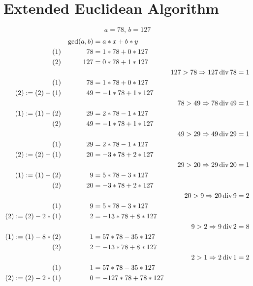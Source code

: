 \documentclass[11pt]{article} %
\begin{document}
\section{Extended Euclidean Algorithm}
\begin{equation}
	a=78,\, b=127
\end{equation}
\allowdisplaybreaks
\begin{align*}
	               && \text{gcd}(a,b) & =a*x+b*y\\
	(1)            && \qquad78        & =1*78+0*127     & \\
	(2)            && 127             & =0*78+1*127     & \\
	               &&                 &                 & 127>78\Rightarrow127\text{\,div\,}78=1\\
	(1)            && 78              & =1*78+0*127     & \\
	(2):=(2)-(1)   && 49              & =-1*78+1*127    & \\
	               &&                 &                 & 78>49\Rightarrow78\text{\,div\,}49=1\\
	(1):=(1)-(2)   && 29              & =2*78-1*127     & \\
	(2)            && 49              & =-1*78+1*127    & \\
	               &&                 &                 & 49>29\Rightarrow49\text{\,div\,}29=1\\
	(1)            && 29              & =2*78-1*127     & \\
	(2):=(2)-(1)   && 20              & =-3*78+2*127    & \\
	               &&                 &                 & 29>20\Rightarrow29\text{\,div\,}20=1\\
	(1):=(1)-(2)   && 9               & =5*78-3*127     & \\
	(2)            && 20              & =-3*78+2*127    & \\
	               &&                 &                 & 20>9\Rightarrow20\text{\,div\,}9=2\\
	(1)            && 9               & =5*78-3*127     & \\
	(2):=(2)-2*(1) && 2               & =-13*78+8*127   & \\
	               &&                 &                 & 9>2\Rightarrow9\text{\,div\,}2=8\\
	(1):=(1)-8*(2) && 1               & =57*78-35*127   & \\
	(2)            && 2               & =-13*78+8*127   & \\
	               &&                 &                 & 2>1\Rightarrow2\text{\,div\,}1=2\\
	(1)            && 1               & =57*78-35*127   & \\
	(2):=(2)-2*(1) && 0               & =-127*78+78*127 &
\end{align*}
\end{document}
